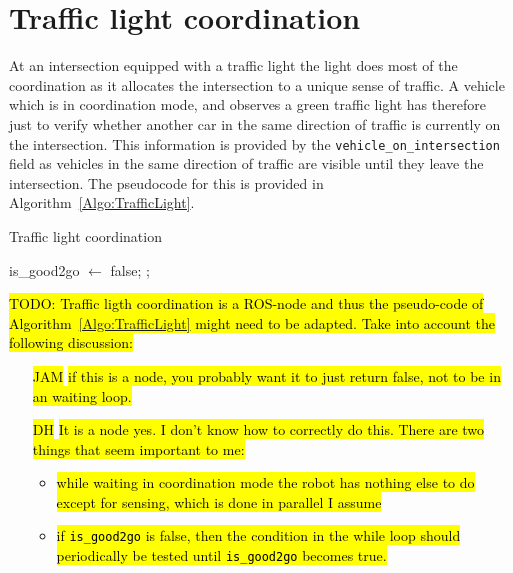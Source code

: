 \documentclass[11pt]{article}
\theoremstyle{definition}
\begin{document}
\section{Traffic light coordination}\label{sec:trafficL}
%
At an intersection equipped with a traffic light the light does most of the coordination as it allocates the intersection to a unique sense of traffic. A vehicle which is in coordination mode, and observes a green traffic light has therefore just to verify whether another car in the same direction of traffic is currently on the intersection. This information is provided by the \texttt{vehicle\_on\_intersection} field as vehicles in the same direction of traffic are visible until they leave the intersection. The pseudocode for this is provided in Algorithm~\ref{Algo:TrafficLight}.
%
\begin{algorithm}[hbt]
\begin{small}
\caption{Traffic light coordination}\label{Algo:TrafficLight}
\begin{algorithmic}
\STATE is\_good2go $\gets$ false;
\ENDWHILE
{}
;
\end{algorithmic}
\end{small}
\end{algorithm} 
%

\hl{TODO: Traffic ligth coordination is a ROS-node and thus the pseudo-code of Algorithm~{\ref{Algo:TrafficLight}} might need to be adapted. Take into account the following discussion:}
\begin{itemize}
\item[\hl{JAM}] \hl{if this is a node, you probably want it to just return false, not to be in an waiting loop.}
\item[\hl{DH}] \hl{It is a node yes. I don't know how to correctly do this. There are two things that seem important to me:}
\begin{itemize}
\item  \hl{while waiting in coordination mode the robot has nothing else to do except for sensing, which is done in parallel I assume}
\item \hl{if \texttt{is\_good2go} is false, then the condition in the while loop should periodically be tested until \texttt{is\_good2go} becomes true.}
\end{itemize}
\end{itemize}
%
%
%
%
%
\end{document}

